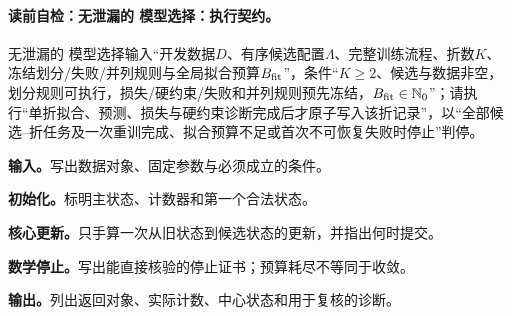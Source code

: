 \paragraph{读前自检：无泄漏的 模型选择：执行契约。}无泄漏的 模型选择输入“开发数据$D$、有序候选配置$\Lambda$、完整训练流程、折数$K$、冻结划分/失败/并列规则与全局拟合预算$B_{\rm fit}$”，条件“$K\ge2$、候选与数据非空，划分规则可执行，损失/硬约束/失败和并列规则预先冻结，$B_{\rm fit}\in\mathbb N_0$”；请执行“单折拟合、预测、损失与硬约束诊断完成后才原子写入该折记录”，以“全部候选--折任务及一次重训完成、拟合预算不足或首次不可恢复失败时停止”判停。\par
\begin{keypointbox}[title={无泄漏的 模型选择：五步阅读}]
\textbf{输入。}写出数据对象、固定参数与必须成立的条件。\par
\textbf{初始化。}标明主状态、计数器和第一个合法状态。\par
\textbf{核心更新。}只手算一次从旧状态到候选状态的更新，并指出何时提交。\par
\textbf{数学停止。}写出能直接核验的停止证书；预算耗尽不等同于收敛。\par
\textbf{输出。}列出返回对象、实际计数、中心状态和用于复核的诊断。
\end{keypointbox}

